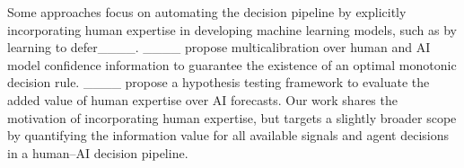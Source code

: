 Some approaches focus on automating the decision pipeline by explicitly incorporating human expertise in developing machine learning models, such as by learning to defer____.
____ propose multicalibration over human and AI model confidence information to guarantee the existence of an optimal monotonic decision rule.
____ propose a hypothesis testing framework to evaluate the added value of human expertise over AI forecasts.
Our work shares the motivation of incorporating human expertise, but targets a slightly broader scope by quantifying the information value for all available signals and agent decisions in a human–AI decision pipeline.
